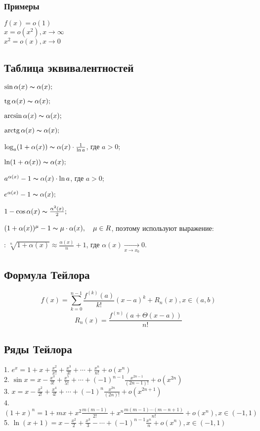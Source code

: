 \subsubsection{Примеры}

$ f(x) = o( 1 ) $ \\
$ x = o( x^2 ), x\to \infty $ \\
$ x^2 = o( x ), x\to 0 $ \\

\subsection{Таблица эквивалентностей}

$\sin\alpha(x)\thicksim\alpha(x);$

$\mathrm{tg}\,\alpha(x)\thicksim\alpha(x);$

$\arcsin{\alpha(x)}\thicksim\alpha(x);$

$\mathrm{arctg}\,\alpha(x)\thicksim\alpha(x);$

$\log_a(1+\alpha(x))\thicksim\alpha(x)\cdot\frac{1}{\ln{a}}$, где $a>0$;

$\ln(1+\alpha (x))\thicksim\alpha(x);$

$a^{\alpha(x)}-1\thicksim\alpha(x)\cdot\ln{a}$, где $a>0$;

$e^{\alpha(x)}-1\thicksim\alpha(x);$

$1-\cos{\alpha(x)}\thicksim\frac{\alpha^2(x)}{2};$

$(1+\alpha(x))^\mu-1\thicksim\mu\cdot\alpha(x),\quad\mu\in R$, поэтому используют выражение:

: $\sqrt[n]{1+\alpha(x)}\approx\frac{\alpha(x)}{n}+1$, где $\alpha(x)\xrightarrow[x\to x_0]{}0$.
\subsection{Формула Тейлора}

$$
f(x) = \sum_{k = 0}^{n - 1} \frac{f^{(k)} (a)}{k!} (x - a)^k + R_n(x), x \in (a, b)
$$
$$
R_n(x) = \frac{f^{(n)}(a + \Theta(x - a))}{n!} 
$$

\subsection{Ряды Тейлора}

1. $e^x = 1 + x + \frac{x^2}{x!} + \frac{x^3}{3!} + \cdots + \frac{x^n}{n!} + o(x^n) $ \\
2. $ \sin{x} = x - \frac{x^3}{3!} + \frac{x^5}{5!} + \cdots + (-1)^{n-1}\frac{x^{2n-1}}{(2n-1)!} + o(x^{2n}) $ \\
3. $ x = x - \frac{x^2}{2!} + \frac{x^4}{4!} + \cdots + (-1)^n\frac{x^{2n}}{(2n)!} + o(x^{2n+1}) $ \\
4. $ (1+x)^n = 1 + mx + x^2\frac{m(m-1)}{2!} + x^n\frac{m(m-1)\cdots(m-n+1)}{n!} + o(x^n), x \in (-1,1) $ \\
5. $ \ln(x + 1) = x - \frac{x^2}{2} + \frac{x^3}{3} - \cdots + (-1)^{n-1}\frac{x^n}{n} + o(x^n), x \in (-1,1) $ \\


